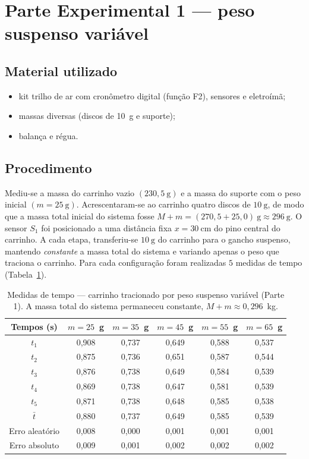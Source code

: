 \documentclass[12pt,a4paper]{article}
\begin{document}
\section{Parte Experimental 1 --- peso suspenso variável}

\subsection{Material utilizado}
\begin{itemize}
	\item kit trilho de ar com cronômetro digital (função F2), sensores e eletroímã;
	\item massas diversas (discos de 10~g e suporte);
	\item balança e régua.
\end{itemize}

\subsection{Procedimento}
Mediu-se a massa do carrinho vazio $(230{,}5~\mathrm{g})$ e a massa do suporte com o peso
inicial $(m = 25~\mathrm{g})$. Acrescentaram-se ao carrinho quatro discos de $10~\mathrm{g}$,
de modo que a massa total inicial do sistema fosse $M + m = (270{,}5 + 25{,}0)~\mathrm{g}
\approx 296~\mathrm{g}$. O sensor $S_1$ foi posicionado a uma distância fixa $x = 30~\mathrm{cm}$
do pino central do carrinho. A cada etapa, transferiu-se $10~\mathrm{g}$ do carrinho para o
gancho suspenso, mantendo \emph{constante} a massa total do sistema e variando apenas o peso que
traciona o carrinho. Para cada configuração foram realizadas $5$ medidas de tempo
(Tabela~\ref{tab:tempos1}).

\begin{table}[!h]
	\centering
	\begin{tabular}{|c|c|c|c|c|c|} \hline \hline
	Tempos (s) & $m=25$~g & $m=35$~g & $m=45$~g & $m=55$~g & $m=65$~g \\ \hline \hline
	$t_1$              & 0,908 & 0,737 & 0,649 & 0,588 & 0,537 \\ \hline
	$t_2$              & 0,875 & 0,736 & 0,651 & 0,587 & 0,544 \\ \hline
	$t_3$              & 0,876 & 0,738 & 0,649 & 0,584 & 0,539 \\ \hline
	$t_4$              & 0,869 & 0,738 & 0,647 & 0,581 & 0,539 \\ \hline
	$t_5$              & 0,871 & 0,738 & 0,648 & 0,585 & 0,538 \\ \hline
	$\bar{t}$          & 0,880 & 0,737 & 0,649 & 0,585 & 0,539 \\ \hline
	Erro aleatório     & 0,008 & 0,000 & 0,001 & 0,001 & 0,001 \\ \hline
	Erro absoluto      & 0,009 & 0,001 & 0,002 & 0,002 & 0,002 \\ \hline \hline
	\end{tabular}
	\caption{Medidas de tempo --- carrinho tracionado por peso suspenso variável (Parte 1).
	A massa total do sistema permaneceu constante, $M+m \approx 0{,}296$~kg.}
	\label{tab:tempos1}
\end{table}
\end{document}
